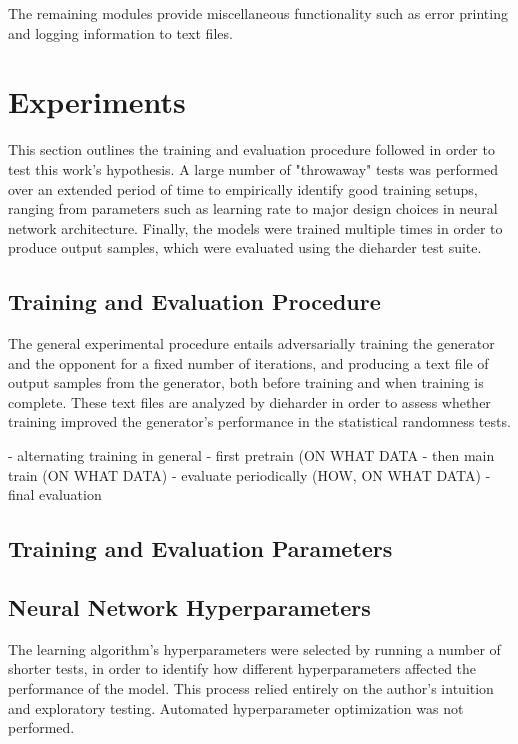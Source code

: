 \documentclass[12pt, titlepage]{report}
\theoremstyle{definition}
\begin{document}
The remaining modules provide miscellaneous functionality such as error printing and logging information to text files.


\chapter{Experiments}\label{chapter:experiments}
This section outlines the training and evaluation procedure followed in order to test this work's hypothesis. A large number of "throwaway" tests was performed over an extended period of time to empirically identify good training setups, ranging from parameters such as learning rate to major design choices in neural network architecture. Finally, the models were trained multiple times in order to produce output samples, which were evaluated using the dieharder test suite.


\section{Training and Evaluation Procedure}
The general experimental procedure entails adversarially training the generator and the opponent for a fixed number of iterations, and producing a text file of output samples from the generator, both before training and when training is complete. These text files are analyzed by dieharder in order to assess whether training improved the generator's performance in the statistical randomness tests.



- alternating training in general
- first pretrain (ON WHAT DATA
- then main train (ON WHAT DATA)
- evaluate periodically (HOW, ON WHAT DATA)
- final evaluation

\section{Training and Evaluation Parameters}


\section{Neural Network Hyperparameters}
The learning algorithm's hyperparameters were selected by running a number of shorter tests, in order to identify how different hyperparameters affected the performance of the model. This process relied entirely on the author's intuition and exploratory testing. Automated hyperparameter optimization was not performed.
\end{document}
